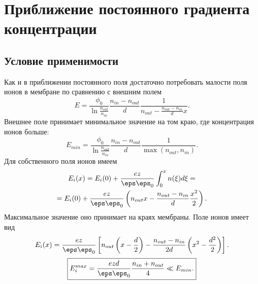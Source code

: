 \documentclass{hedwork}
\begin{document}
\section{Приближение постоянного градиента концентрации}
\subsection{Условие применимости}
    Как и в приближении постоянного поля достаточно потребовать малости поля
    ионов в мембране по сравнению с внешним полем
    \[
        E = \frac{\phi_0}{\ln\frac{n_{out}}{n_{in}}}
            \frac{n_{in} - n_{out}}{d}
            \frac{1}{n_{out} - \frac{n_{out} - n_{in}}{d} x}.
    \]
    Внешнее поле принимает минимальное значение на том краю, где концентрация
    ионов больше:
    \[
        E_{min} = \frac{\phi_0}{\ln\frac{n_{out}}{n_{in}}}
            \frac{n_{in} - n_{out}}{d}\frac{1}{\max(n_{out}, n_{in})}.
    \]
    Для собственного поля ионов имеем
    \begin{gather}
        E_i(x) = E_i(0) + \frac{ez}{\eps\eps_0}\int_0^x n(\xi)d\xi = \nonumber\\
        = E_i(0) + \frac{ez}{\eps\eps_0}\left(
        n_{out} x - \frac{n_{out} - n_{in}}{d}\frac{x^2}{2}\right).
    \end{gather}
    Максимальное значение оно принимает на краях мембраны. Поле ионов имеет вид
    \begin{equation}
        E_i(x) = \frac{ez}{\eps\eps_0}\left[
        n_{out} \left(x-\frac{d}{2}\right) - \frac{n_{out} - n_{in}}{2d}
        \left(x^2 - \frac{d^2}{2}\right)
        \right].
    \end{equation}
    \begin{equation}
        \boxed{
        E_i^{max} = \frac{ezd}{\eps\eps_0}\frac{n_{in}+n_{out}}{4} \ll E_{min}.}
    \end{equation}
\end{document}
